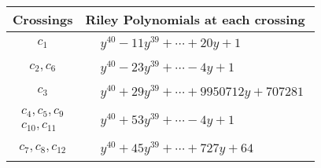 \documentclass[1p]{elsarticle_modified}
\theoremstyle{definition}
\begin{document}
\begin{tabular}{m{50pt}|m{274pt}}
Crossings & \hspace{64pt}Riley Polynomials at each crossing \\
\hline $$\begin{aligned}c_{1}\end{aligned}$$&$\begin{aligned}
&y^{40}-11 y^{39}+\cdots+20 y+1
\end{aligned}$\\
\hline $$\begin{aligned}c_{2},c_{6}\end{aligned}$$&$\begin{aligned}
&y^{40}-23 y^{39}+\cdots-4 y+1
\end{aligned}$\\
\hline $$\begin{aligned}c_{3}\end{aligned}$$&$\begin{aligned}
&y^{40}+29 y^{39}+\cdots+9950712 y+707281
\end{aligned}$\\
\hline $$\begin{aligned}c_{4},c_{5},c_{9}\\c_{10},c_{11}\end{aligned}$$&$\begin{aligned}
&y^{40}+53 y^{39}+\cdots-4 y+1
\end{aligned}$\\
\hline $$\begin{aligned}c_{7},c_{8},c_{12}\end{aligned}$$&$\begin{aligned}
&y^{40}+45 y^{39}+\cdots+727 y+64
\end{aligned}$\\
\hline
\end{tabular}
\vskip 2pc
\end{document}
